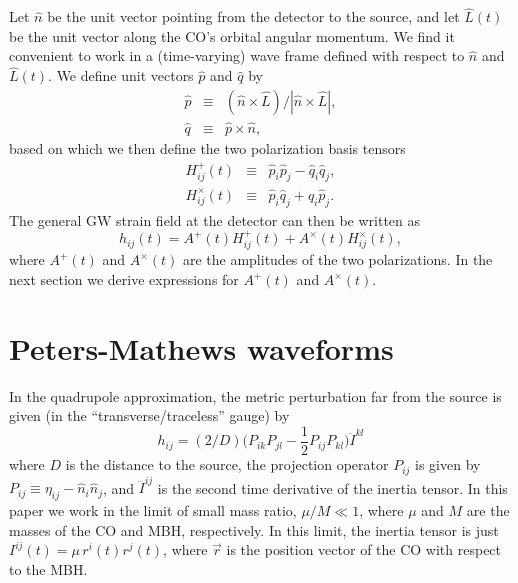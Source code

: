 \documentclass[11pt]{report}
\def\be{\begin{equation}}
\def\ee{\end{equation}}
\begin{document}
Let ${\hat n}$ be the unit vector pointing from the detector
to the source, and let ${ \hat L}(t)$ be the unit vector along
the CO's orbital angular momentum.
We find it convenient to work in a (time-varying) wave frame defined with
respect to ${ \hat n}$ and ${ \hat L}(t)$. We define unit vectors
${ \hat p}$ and ${ \hat q}$ by
\begin{eqnarray} \label{pq}
{ \hat p} &\equiv& ({ \hat n}\times { \hat L})/
                    |{ \hat n}\times { \hat L}|, \nonumber\\
{ \hat q} &\equiv& { \hat p} \times { \hat n},
\end{eqnarray}
based on which we then
define the two polarization basis tensors
\begin{eqnarray} \label{H}
H_{ij}^{+}(t)      & \equiv & \hat p_i \hat p_j - \hat q_i \hat q_j, \nonumber\\
H_{ij}^{\times}(t) & \equiv & \hat p_i \hat q_j + \hat q_i \hat p_j.
\end{eqnarray}
The general GW strain field at the detector can then be written as
\begin{equation} \label{hab}
h_{ij}(t)=
A^{+}(t)H_{ij}^{+}(t) + A^{\times}(t)H_{ij}^{\times}(t),
\end{equation}
where $A^{+}(t)$ and $A^{\times}(t)$ are the amplitudes of the two
polarizations.  In  the next section we derive expressions for $A^{+}(t)$ and $A^{\times}(t)$.

\section{Peters-Mathews waveforms}

In the quadrupole approximation, the metric perturbation
far from the source is given (in the ``transverse/traceless''
gauge) by \cite{MTW}
\be\label{quad}
h_{ij} = (2/D)\bigl(P_{ik}P_{jl} -
\frac{1}{2}P_{ij}P_{kl}\bigr) \ddot I^{kl}
\ee
where %
$D$ is the distance to the source, the projection operator $P_{ij}$ is
given by
$P_{ij} \equiv \eta_{ij} - {\hat n}_i{\hat n}_j$, and
$\ddot I^{ij}$ is the second time derivative of the inertia tensor.
In this paper we work in the limit of small mass ratio, $\mu/M\ll 1$,
where $\mu$ and $M$ are the masses of the CO and MBH, respectively.
In this limit, the inertia tensor is just
$I^{ij}(t) = \mu\, r^i(t) r^j(t)$,
where $\vec r$ is the position vector of the CO with respect to the MBH.
\end{document}
